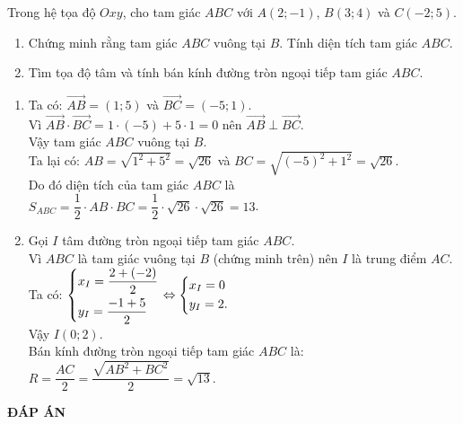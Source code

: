\begin{bt}%
 Trong hệ tọa độ $Oxy$, cho tam giác $ABC$ với $A(2;-1)$, $B(3;4)$ và $C(-2;5)$.
 \begin{enumerate}
  \item Chứng minh rằng tam giác $ABC$ vuông tại $B$. Tính diện tích tam giác $ABC$.
  \item Tìm tọa độ tâm và tính bán kính đường tròn ngoại tiếp tam giác $ABC$.
 \end{enumerate}
 \loigiai
 {
 \begin{enumerate}
  \item Ta có: $\vec{AB} = (1;5)$ và $\vec{BC} = (-5;1)$.\\
  Vì $\vec{AB} \cdot \vec{BC} = 1 \cdot (-5) + 5 \cdot 1 = 0$ nên $\vec{AB} \perp \vec{BC}$.\\
  Vậy tam giác $ABC$ vuông tại $B$.\\
  Ta lại có: $AB = \sqrt{1^2 + 5^2} = \sqrt{26}$ và $BC = \sqrt{(-5)^2 + 1^2} = \sqrt{26}$.\\
  Do đó diện tích của tam giác $ABC$ là $S_{ABC} = \dfrac{1}{2} \cdot AB \cdot BC = \dfrac{1}{2} \cdot \sqrt{26} \cdot \sqrt{26} = 13$.
  \item Gọi $I$ tâm đường tròn ngoại tiếp tam giác $ABC$.\\
  Vì $ABC$ là tam giác vuông tại $B$ (chứng minh trên) nên $I$ là trung điểm $AC$.\\
  Ta có: $\left\{\begin{aligned}& x_I = \dfrac{2 + (-2)}{2} \\& y_I = \dfrac{-1 + 5}{2}\end{aligned}\right. \Leftrightarrow \left\{\begin{aligned}& x_I = 0 \\& y_I = 2.\end{aligned}\right.$\\
  Vậy $I(0;2)$.\\
  Bán kính đường tròn ngoại tiếp tam giác $ABC$ là: $R = \dfrac{AC}{2} = \dfrac{\sqrt{AB^2 + BC^2}}{2} =\sqrt{13}$.
 \end{enumerate}
 }
\end{bt}





\newpage
\begin{center}
	\textbf{ĐÁP ÁN}
\end{center}
\begin{multicols}{10}
	 
\end{multicols}
